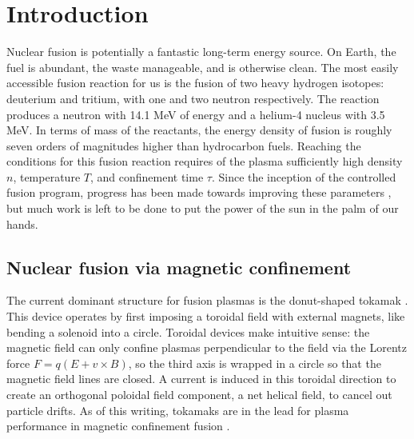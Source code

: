 \graphicspath{{Chapters/Chapter_intro/}}

\chapter{Introduction}
\label{ch:intro}

Nuclear fusion is potentially a fantastic long-term energy source. On Earth, the fuel is abundant, the waste manageable, and is otherwise clean. The most easily accessible fusion reaction for us is the fusion of two heavy hydrogen isotopes: deuterium and tritium, with one and two neutron respectively. The reaction produces a neutron with 14.1 MeV of energy and a helium-4 nucleus with 3.5 MeV. In terms of mass of the reactants, the energy density of fusion is roughly seven orders of magnitudes higher than hydrocarbon fuels. Reaching the conditions for this fusion reaction requires of the plasma sufficiently high density $n$, temperature $T$, and confinement time $\tau$. Since the inception of the controlled fusion program, progress has been made towards improving these parameters \cite{wurzel_progress_2022}, but much work is left to be done to put the power of the sun in the palm of our hands.

\section{Nuclear fusion via magnetic confinement}

The current dominant structure for fusion plasmas is the donut-shaped tokamak \cite{john_wesson_tokamaks_2004}. This device operates by first imposing a toroidal field with external magnets, like bending a solenoid into a circle. Toroidal devices make intuitive sense: the magnetic field can only confine plasmas perpendicular to the field via the Lorentz force $F = q(E + v \times B)$, so the third axis is wrapped in a circle so that the magnetic field lines are closed. A current is induced in this toroidal direction to create an orthogonal poloidal field component, a net helical field, to cancel out particle drifts. As of this writing, tokamaks are in the lead for plasma performance in magnetic confinement fusion \cite{wurzel_progress_2022}.

